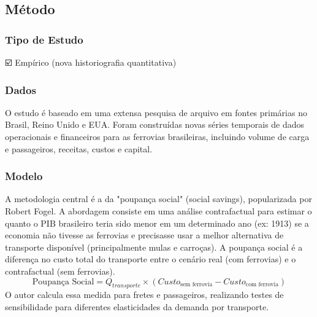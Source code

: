 \documentclass[12pt]{article}
\begin{document}
\subsection*{Método}

\subsubsection*{Tipo de Estudo}
☑️ Empírico (nova historiografia quantitativa)

\subsubsection*{Dados}
O estudo é baseado em uma extensa pesquisa de arquivo em fontes primárias no Brasil, Reino Unido e EUA. Foram construídas novas séries temporais de dados operacionais e financeiros para as ferrovias brasileiras, incluindo volume de carga e passageiros, receitas, custos e capital.

\subsubsection*{Modelo}
A metodologia central é a da "poupança social" (social savings), popularizada por Robert Fogel. A abordagem consiste em uma análise contrafactual para estimar o quanto o PIB brasileiro teria sido menor em um determinado ano (ex: 1913) se a economia não tivesse as ferrovias e precisasse usar a melhor alternativa de transporte disponível (principalmente mulas e carroças). A poupança social é a diferença no custo total do transporte entre o cenário real (com ferrovias) e o contrafactual (sem ferrovias).
\begin{equation*}
    \text{Poupança Social} = Q_{transporte} \times (Custo_{\text{sem ferrovia}} - Custo_{\text{com ferrovia}})
\end{equation*}
O autor calcula essa medida para fretes e passageiros, realizando testes de sensibilidade para diferentes elasticidades da demanda por transporte.
\end{document}
